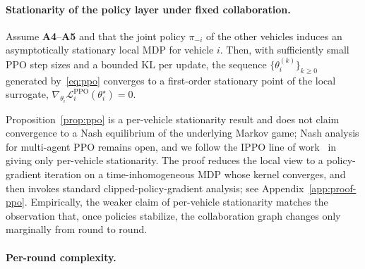 \paragraph{Stationarity of the policy layer under fixed collaboration.}

\begin{proposition}
\label{prop:ppo}
Assume \textbf{A4}--\textbf{A5} and that the joint policy $\pi_{-i}$ of the other vehicles induces an asymptotically stationary local MDP for vehicle $i$. Then, with sufficiently small PPO step sizes and a bounded KL per update, the sequence $\{\theta_i^{(k)}\}_{k\ge 0}$ generated by~\eqref{eq:ppo} converges to a first-order stationary point of the local surrogate, $\nabla_{\theta_i}\mathcal{L}_i^{\mathrm{PPO}}(\theta_i^\star)=0$.
\end{proposition}

Proposition~\ref{prop:ppo} is a per-vehicle stationarity result and does not claim convergence to a Nash equilibrium of the underlying Markov game; Nash analysis for multi-agent PPO remains open, and we follow the IPPO line of work~\cite{dewitt2020independent} in giving only per-vehicle stationarity. The proof reduces the local view to a policy-gradient iteration on a time-inhomogeneous MDP whose kernel converges, and then invokes standard clipped-policy-gradient analysis; see Appendix~\ref{app:proof-ppo}. Empirically, the weaker claim of per-vehicle stationarity matches the observation that, once policies stabilize, the collaboration graph changes only marginally from round to round.

\paragraph{Per-round complexity.}

